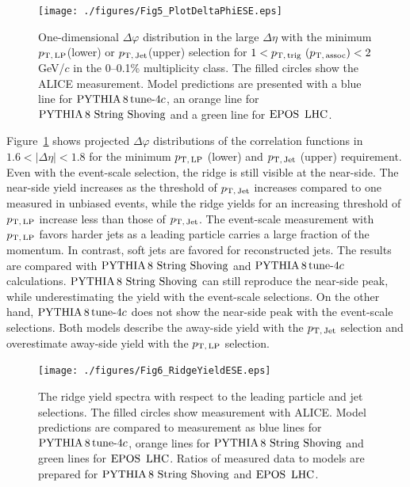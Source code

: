 \begin{figure}[h!]
	\centering
	\texttt{[image: ./figures/Fig5\_PlotDeltaPhiESE.eps]}
	\caption{ One-dimensional $\Delta\varphi$ distribution in the large $\Delta\eta$ with the minimum $p_\mathrm{T,\,LP}$(lower) or $p_\mathrm{T,\,Jet}$(upper) selection for $1< p_\mathrm{T,\,trig}~\mathrm (p_\mathrm{T,\,assoc}) <2$ GeV/$c$ in the 0--0.1\% multiplicity class. The filled circles show the ALICE measurement. Model predictions are presented with a blue line for $\mathrm{PYTHIA}\,8\,\mathrm{tune}{\text -}4c$, an orange line for ${\mathrm{PYTHIA}\,8~\mathrm{String}~}\mathrm{Shoving}$ and a green line for ${\mathrm{EPOS}\,~\mathrm{LHC}}$.}
	\label{fig:PlotDeltaPhiESE}
\end{figure}

Figure~\ref{fig:PlotDeltaPhiESE} shows projected $\Delta\varphi$ distributions of the correlation functions in $1.6<|\Delta\eta|<1.8$ for the minimum $p_\mathrm{T,\,LP}$ (lower) and $p_\mathrm{T,\,Jet}$ (upper) requirement. Even with the event-scale selection, the ridge is still visible at the near-side. The near-side yield increases as the threshold of $p_\mathrm{T,\,Jet}$ increases compared to one measured in unbiased events, while the ridge yields for an increasing threshold of $p_\mathrm{T,\,LP}$ increase less than those of $p_\mathrm{T,\,Jet}$. The event-scale measurement with $p_\mathrm{T,\,LP}$ favors harder jets as a leading particle carries a large fraction of the momentum. In contrast, soft jets are favored for reconstructed jets. The results are compared with ${\mathrm{PYTHIA}\,8~\mathrm{String}~}\mathrm{Shoving}$ and $\mathrm{PYTHIA}\,8\,\mathrm{tune}{\text -}4c$ calculations. ${\mathrm{PYTHIA}\,8~\mathrm{String}~}\mathrm{Shoving}$ can still reproduce the near-side peak, while underestimating the yield with the event-scale selections. On the other hand, $\mathrm{PYTHIA}\,8\,\mathrm{tune}{\text -}4c$ does not show the near-side peak with the event-scale selections. Both models describe the away-side yield with the $p_\mathrm{T,\,Jet}$ selection and overestimate away-side yield with the $p_\mathrm{T,\,LP}$ selection.

\begin{figure}[h!]
	\centering
	\texttt{[image: ./figures/Fig6\_RidgeYieldESE.eps]}
	\caption{The ridge yield spectra with respect to the leading particle and jet selections. The filled circles show measurement with ALICE. Model predictions are compared to measurement as blue lines for $\mathrm{PYTHIA}\,8\,\mathrm{tune}{\text -}4c$, orange lines for ${\mathrm{PYTHIA}\,8~\mathrm{String}~}\mathrm{Shoving}$ and green lines for ${\mathrm{EPOS}\,~\mathrm{LHC}}$. Ratios of measured data to models are prepared for ${\mathrm{PYTHIA}\,8~\mathrm{String}~}\mathrm{Shoving}$ and ${\mathrm{EPOS}\,~\mathrm{LHC}}$.}
	\label{fig:RidgeYield_ESE}
\end{figure}


